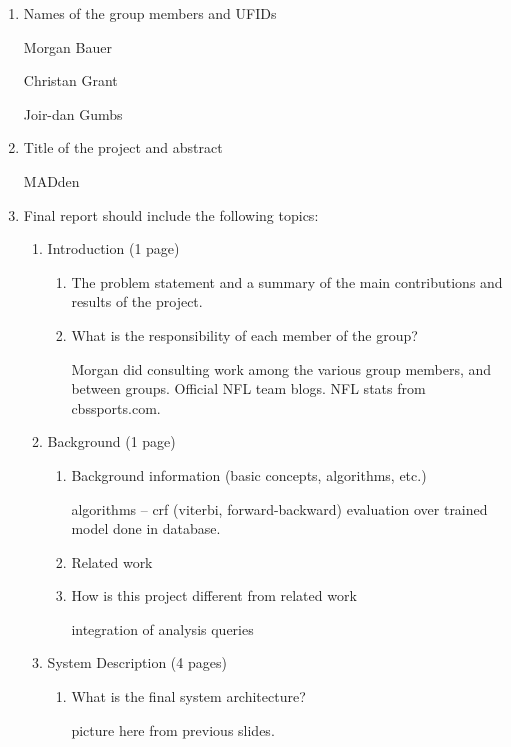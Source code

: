 \documentclass{article}
\begin{document}
\begin{enumerate}
\item Names of the group members and UFIDs


  Morgan Bauer

  Christan Grant

  Joir-dan Gumbs

\item Title of the project and abstract

  MADden

\item Final report should include the following topics:
  \begin{enumerate}

  \item  Introduction (1 page)
    \begin{enumerate}
    \item The problem statement and a summary of the main contributions and results of the project.
    \item What is the responsibility of each member of the group?

      Morgan did consulting work among the various group members, and between groups.
      Official NFL team blogs. NFL stats from cbssports.com.
    \end{enumerate}

  \item Background (1 page)
    \begin{enumerate}
    \item Background information (basic concepts, algorithms, etc.)

      algorithms -- crf (viterbi, forward-backward) evaluation over trained model done in database.

    \item Related work
    \item How is this project different from related work

      integration of analysis queries
    \end{enumerate}

  \item System Description (4 pages)
    \begin{enumerate}
    \item What is the final system architecture?

      picture here from previous slides.


\end{enumerate}
\end{enumerate}
\end{enumerate}
\end{document}
